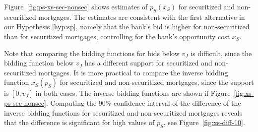 \documentclass[11pt,twopage]{article}
\begin{document}
Figure~\ref{fig:ps-xs-sec-nonsec} shows estimates of $p_S(x_S)$ for securitized and non-securitized mortgages. The estimates are consistent with the first alternative in our Hypothesis \ref{hyp:sp}, namely that the bank's bid is higher for non-securitized than for securitized mortgages, controlling for the bank's opportunity cost $x_S$.

Note that comparing the bidding functions for bids below $v_J$ is difficult, since the bidding function below $v_J$ has a different support for securitized and non-securitized mortgages. It is more practical to compare the inverse bidding function $x_S(p_S)$ for securitized and non-securitized mortgages, since the support is $[0,v_J]$ in both cases. The inverse bidding functions are shown if Figure~\ref{fig:xs-ps-sec-nonsec}. Computing the 90\% confidence interval of the difference of the inverse bidding functions for securitized and non-securitized mortgages reveals that the difference is significant for high values of $p_S$, see Figure~\ref{fig:xs-diff-10}. 
\end{document}
